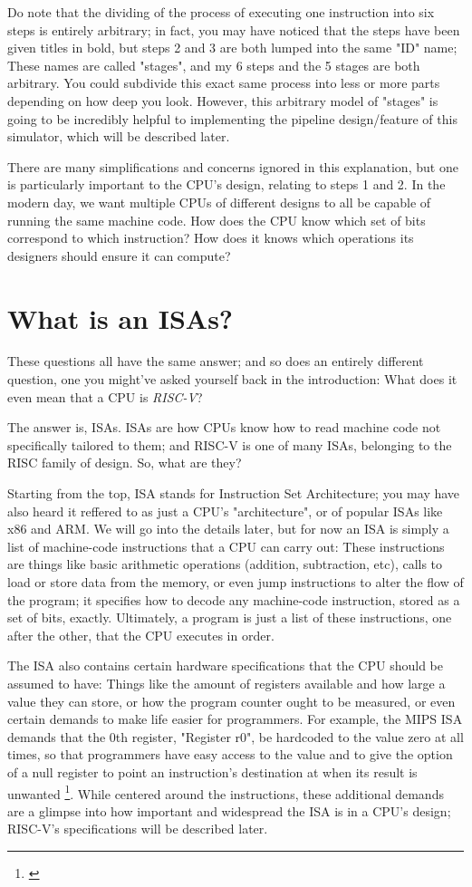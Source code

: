 \documentclass[12pt,twoside]{reedthesis}
\begin{document}
Do note that the dividing of the process of executing one instruction into six steps is entirely arbitrary; in fact, you may have noticed that the steps have been given titles in bold, but steps 2 and 3 are both lumped into the same "ID" name; These names are called "stages", and my 6 steps and the 5 stages are both arbitrary. You could subdivide this exact same process into less or more parts depending on how deep you look. However, this arbitrary model of "stages" is going to be incredibly helpful to implementing the pipeline design/feature of this simulator, which will be described later.

There are many simplifications and concerns ignored in this explanation, but one is particularly important to the CPU's design, relating to steps 1 and 2. In the modern day, we want multiple CPUs of different designs to all be capable of running the same machine code. How does the CPU know which set of bits correspond to which instruction? How does it knows which operations its designers should ensure it can compute?

\section{What is an ISAs?}

These questions all have the same answer; and so does an entirely different question, one you might've asked yourself back in the introduction: What does it even mean that a CPU is \textit{RISC-V}?

The answer is, ISAs. ISAs are how CPUs know how to read machine code not specifically tailored to them; and RISC-V is one of many ISAs, belonging to the RISC family of design. So, what are they?

Starting from the top, ISA stands for Instruction Set Architecture; you may have also heard it reffered to as just a CPU's "architecture", or of popular ISAs like x86 and ARM. We will go into the details later, but for now an ISA is simply a list of machine-code instructions that a CPU can carry out: These instructions are things like basic arithmetic operations (addition, subtraction, etc), calls to load or store data from the memory, or even jump instructions to alter the flow of the program; it specifies how to decode any machine-code instruction, stored as a set of bits, exactly. Ultimately, a program is just a list of these instructions, one after the other, that the CPU executes in order.

The ISA also contains certain hardware specifications that the CPU should be assumed to have: Things like the amount of registers available and how large a value they can store, or how the program counter ought to be measured, or even certain demands to make life easier for programmers. For example, the MIPS ISA demands that the 0th register, "Register r0", be hardcoded to the value zero at all times, so that programmers have easy access to the value and to give the option of a null register to point an instruction's destination at when its result is unwanted \footnote{\cite{waterman}}. While centered around the instructions, these additional demands are a glimpse into how important and widespread the ISA is in a CPU's design; RISC-V's specifications will be described later.
\end{document}
